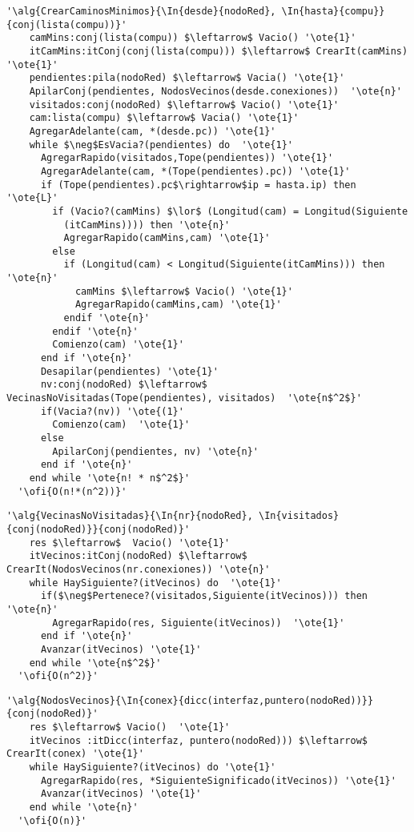 \begin{lstlisting}[mathescape]
  '\alg{CrearCaminosMinimos}{\In{desde}{nodoRed}, \In{hasta}{compu}}{conj(lista(compu))}'
    camMins:conj(lista(compu)) $\leftarrow$ Vacio() '\ote{1}'
    itCamMins:itConj(conj(lista(compu))) $\leftarrow$ CrearIt(camMins) '\ote{1}'
    pendientes:pila(nodoRed) $\leftarrow$ Vacia() '\ote{1}'
    ApilarConj(pendientes, NodosVecinos(desde.conexiones))  '\ote{n}'
    visitados:conj(nodoRed) $\leftarrow$ Vacio() '\ote{1}'
    cam:lista(compu) $\leftarrow$ Vacia() '\ote{1}'
    AgregarAdelante(cam, *(desde.pc)) '\ote{1}'
    while $\neg$EsVacia?(pendientes) do  '\ote{1}'
      AgregarRapido(visitados,Tope(pendientes)) '\ote{1}'
      AgregarAdelante(cam, *(Tope(pendientes).pc)) '\ote{1}'
      if (Tope(pendientes).pc$\rightarrow$ip = hasta.ip) then '\ote{L}'
        if (Vacio?(camMins) $\lor$ (Longitud(cam) = Longitud(Siguiente
          (itCamMins)))) then '\ote{n}'
          AgregarRapido(camMins,cam) '\ote{1}'
        else
          if (Longitud(cam) < Longitud(Siguiente(itCamMins))) then '\ote{n}'
            camMins $\leftarrow$ Vacio() '\ote{1}'
            AgregarRapido(camMins,cam) '\ote{1}'
          endif '\ote{n}'
        endif '\ote{n}'
        Comienzo(cam) '\ote{1}'
      end if '\ote{n}'
      Desapilar(pendientes) '\ote{1}'
      nv:conj(nodoRed) $\leftarrow$ VecinasNoVisitadas(Tope(pendientes), visitados)  '\ote{n$^2$}'
      if(Vacia?(nv)) '\ote{(1}'
        Comienzo(cam)  '\ote{1}'
      else
        ApilarConj(pendientes, nv) '\ote{n}'
      end if '\ote{n}'
    end while '\ote{n! * n$^2$}'
  '\ofi{O(n!*(n^2))}'
\end{lstlisting}


\begin{lstlisting}[mathescape]
  '\alg{VecinasNoVisitadas}{\In{nr}{nodoRed}, \In{visitados}{conj(nodoRed)}}{conj(nodoRed)}'
    res $\leftarrow$  Vacio() '\ote{1}'
    itVecinos:itConj(nodoRed) $\leftarrow$ CrearIt(NodosVecinos(nr.conexiones)) '\ote{n}'
    while HaySiguiente?(itVecinos) do  '\ote{1}'                                                   
      if($\neg$Pertenece?(visitados,Siguiente(itVecinos))) then '\ote{n}'
        AgregarRapido(res, Siguiente(itVecinos))  '\ote{1}'
      end if '\ote{n}'
      Avanzar(itVecinos) '\ote{1}'
    end while '\ote{n$^2$}'
  '\ofi{O(n^2)}'
\end{lstlisting}

\begin{lstlisting}[mathescape]
  '\alg{NodosVecinos}{\In{conex}{dicc(interfaz,puntero(nodoRed))}}{conj(nodoRed)}'
    res $\leftarrow$ Vacio()  '\ote{1}'
    itVecinos :itDicc(interfaz, puntero(nodoRed))) $\leftarrow$ CrearIt(conex) '\ote{1}'
    while HaySiguiente?(itVecinos) do '\ote{1}'                                                    
      AgregarRapido(res, *SiguienteSignificado(itVecinos)) '\ote{1}'
      Avanzar(itVecinos) '\ote{1}'
    end while '\ote{n}'
  '\ofi{O(n)}'
\end{lstlisting}


